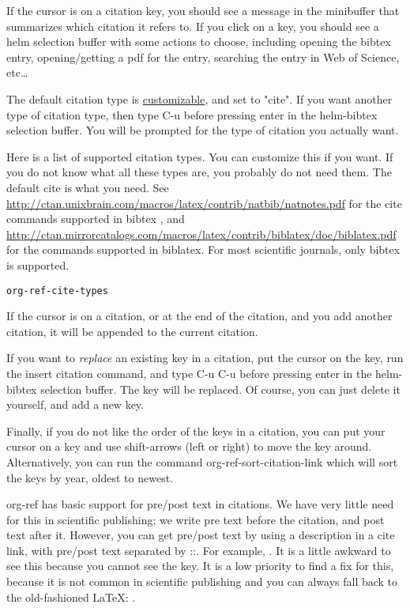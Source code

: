 \documentclass[11pt]{article}
\begin{document}
If the cursor is on a citation key, you should see a message in the minibuffer that summarizes which citation it refers to. If you click on a key, you should see a helm selection buffer with some actions to choose, including opening the bibtex entry, opening/getting a pdf for the entry, searching the entry in Web of Science, etc\ldots{}

The default citation type is \hyperref[sec:orgheadline1]{customizable}, and set to "cite". If you want another type of citation type, then type C-u before pressing enter in the helm-bibtex selection buffer. You will be prompted for the type of citation you actually want.

Here is a list of supported citation types. You can customize this if you want. If you do not know what all these types are, you probably do not need them. The default cite is what you need. See \url{http://ctan.unixbrain.com/macros/latex/contrib/natbib/natnotes.pdf}
 for the cite commands supported in bibtex , and \url{http://ctan.mirrorcatalogs.com/macros/latex/contrib/biblatex/doc/biblatex.pdf}
 for the commands supported in biblatex. For most scientific journals, only bibtex is supported. 

\begin{verbatim}
org-ref-cite-types
\end{verbatim}

If the cursor is on a citation, or at the end of the citation, and you add another citation, it will be appended to the current citation.

If you want to \emph{replace} an existing key in a citation, put the cursor on the key, run the insert citation command, and type C-u C-u before pressing enter in the helm-bibtex selection buffer. The key will be replaced. Of course, you can just delete it yourself, and add a new key.

Finally, if you do not like the order of the keys in a citation, you can put your cursor on a key and use shift-arrows (left or right) to move the key around. Alternatively, you can run the command org-ref-sort-citation-link which will sort the keys by year, oldest to newest.

org-ref has basic support for pre/post text in citations. We have very little need for this in scientific publishing; we write pre text before the citation, and post text after it. However, you can get pre/post text by using a description in a cite link, with pre/post text separated by ::. For example, \cite[See page 20][, for example]{Dominik201408}. It is a little awkward to see this because you cannot see the key. It is a low priority to find a fix for this, because it is not common in scientific publishing and you can always fall back to the old-fashioned \LaTeX{}: \cite[See page 20][, for example]{Dominik201408}.
\end{document}
